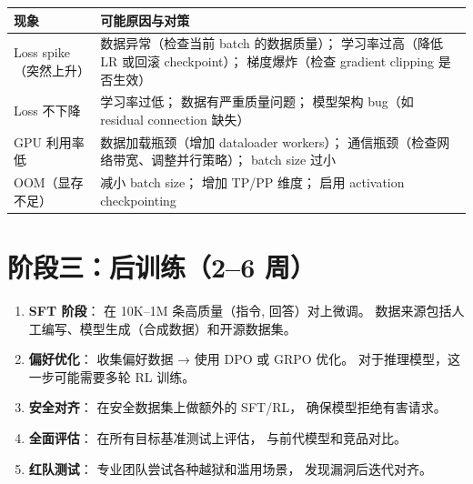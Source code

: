 \begin{warnbox}[常见故障与对策]
\begin{tabularx}{\linewidth}{l X}
\toprule
\textbf{现象} & \textbf{可能原因与对策} \\
\midrule
Loss spike（突然上升） &
  数据异常（检查当前 batch 的数据质量）；
  学习率过高（降低 LR 或回滚 checkpoint）；
  梯度爆炸（检查 gradient clipping 是否生效） \\
Loss 不下降 &
  学习率过低；
  数据有严重质量问题；
  模型架构 bug（如 residual connection 缺失） \\
GPU 利用率低 &
  数据加载瓶颈（增加 dataloader workers）；
  通信瓶颈（检查网络带宽、调整并行策略）；
  batch size 过小 \\
OOM（显存不足） &
  减小 batch size；
  增加 TP/PP 维度；
  启用 activation checkpointing \\
\bottomrule
\end{tabularx}
\end{warnbox}

\section{阶段三：后训练（2--6 周）}

\begin{enumerate}[noitemsep]
  \item \textbf{SFT 阶段}：
        在 10K--1M 条高质量（指令, 回答）对上微调。
        数据来源包括人工编写、模型生成（合成数据）和开源数据集。
  \item \textbf{偏好优化}：
        收集偏好数据 → 使用 DPO 或 GRPO 优化。
        对于推理模型，这一步可能需要多轮 RL 训练。
  \item \textbf{安全对齐}：
        在安全数据集上做额外的 SFT/RL，
        确保模型拒绝有害请求。
  \item \textbf{全面评估}：
        在所有目标基准测试上评估，
        与前代模型和竞品对比。
  \item \textbf{红队测试}：
        专业团队尝试各种越狱和滥用场景，
        发现漏洞后迭代对齐。
\end{enumerate}

